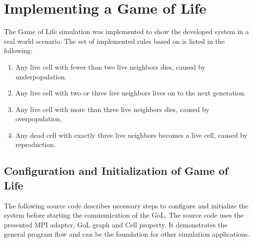 
\section{Implementing a Game of Life}
\label{sec:impl:gol}
The Game of Life simulation was implemented to show the developed
system in a real world scenario. The set of implemented rules based on
\cite{ref:gol_rules} is listed in the following:

\begin{enumerate}
\item Any live cell with fewer than two live neighbors dies, caused by underpopulation.
\item Any live cell with two or three live neighbors lives on to the next generation.
\item Any live cell with more than three live neighbors dies, caused by overpopulation.
\item Any dead cell with exactly three live neighbors becomes a live cell, caused by reproduction.
\end{enumerate}

\subsection{Configuration and Initialization of Game of Life}
The following source code describes necessary steps to configure and
initialize the system before starting the communication of the
GoL. The source code uses the presented MPI adapter, GoL graph and
Cell property. It demonstrates the general program flow and can be the
foundation for other simulation applications.

